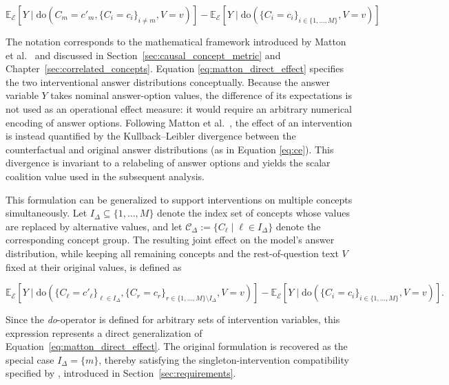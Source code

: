 \begin{equation}
	\label{eq:matton_direct_effect}
	\mathbb{E}_{\mathcal{E}}[Y \mid \text{do}(C_m = c'_m, \{C_i = c_i\}_{i \neq m}, V = v)] -
	\mathbb{E}_{\mathcal{E}}[Y \mid \text{do}(\{C_i = c_i\}_{i \in \{1,\dots,M\}}, V = v)]
\end{equation}

The notation corresponds to the mathematical framework introduced by Matton et al.~\cite{mattonWalkTalkMeasuring2024} and discussed in Section~\ref{sec:causal_concept_metric} and Chapter~\ref{sec:correlated_concepts}. Equation \ref{eq:matton_direct_effect} specifies the two interventional answer distributions conceptually. Because the answer variable $Y$ takes nominal answer-option values, the difference of its expectations is not used as an operational effect measure: it would require an arbitrary numerical encoding of answer options. Following Matton et al.~\cite{mattonWalkTalkMeasuring2024}, the effect of an intervention is instead quantified by the Kullback–Leibler divergence between the counterfactual and original answer distributions (as in Equation \ref{eq:ce}). This divergence is invariant to a relabeling of answer options and yields the scalar coalition value used in the subsequent analysis.

This formulation can be generalized to support interventions on multiple concepts simultaneously. Let $I_{\Delta} \subseteq \{1,\dots,M\}$ denote the index set of concepts whose values are replaced by alternative values, and let $\mathcal{C}_{\Delta}:=\{C_\ell \mid \ell \in I_{\Delta}\}$ denote the corresponding concept group. The resulting joint effect on the model's answer distribution, while keeping all remaining concepts and the rest-of-question text $V$ fixed at their original values, is defined as

\begin{equation}
	\label{eq:matton_multi_direct_effect}
	\mathbb{E}_{\mathcal{E}}[Y \mid
		\text{do}(\{C_\ell = c'_\ell\}_{\ell \in I_{\Delta}},
		\{C_r = c_r\}_{r \in \{1,\dots,M\}\setminus I_{\Delta}},
		V = v)]
	-
	\mathbb{E}_{\mathcal{E}}[Y \mid
		\text{do}(\{C_i = c_i\}_{i \in \{1,\dots,M\}},
		V = v)].
\end{equation}

Since the \emph{do}-operator is defined for arbitrary sets of intervention variables, this expression represents a direct generalization of Equation~\ref{eq:matton_direct_effect}. The original formulation is recovered as the special case $I_{\Delta}=\{m\}$, thereby satisfying the singleton-intervention compatibility specified by , introduced in Section~\ref{sec:requirements}.

